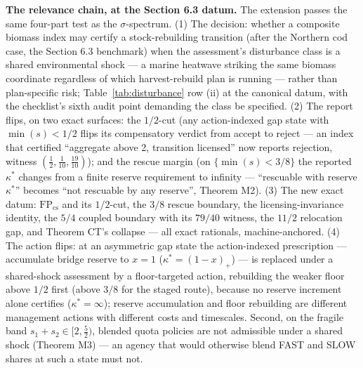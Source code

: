 \documentclass[3p,11pt]{elsarticle}
\begin{document}
\textbf{The relevance chain, at the Section 6.3 datum.} The extension
passes the same four-part test as the \(\sigma\)-spectrum. (1) The
decision: whether a composite biomass index may certify a
stock-rebuilding transition (after the Northern cod case, the Section 6.3
benchmark) when the assessment's disturbance class is a shared
environmental shock --- a marine heatwave striking the same biomass
coordinate regardless of which harvest-rebuild plan is running ---
rather than plan-specific risk; Table~\ref{tab:disturbance} row (ii) at
the canonical datum, with the checklist's sixth audit point demanding
the class be specified. (2) The report flips, on two exact surfaces: the
\(1/2\)-cut (any action-indexed gap state with \(\min(s) < 1/2\)
flips its compensatory verdict from accept to reject --- an index that
certified ``aggregate above 2, transition licensed'' now reports
rejection, witness \((\tfrac12, \tfrac1{10}, \tfrac{19}{10})\)); and
the rescue margin (on \(\{\min(s) < 3/8\}\) the reported
\(\kappa^*\) changes from a finite reserve requirement to infinity
--- ``rescuable with reserve \(\kappa^*\)'' becomes ``not rescuable
by any reserve'', Theorem M2). (3) The new exact datum:
\(\mathrm{FP}_{\mathrm{cs}}\) and its \(1/2\)-cut, the \(3/8\)
rescue boundary, the licensing-invariance identity, the \(5/4\)
coupled boundary with its \(79/40\) witness, the \(11/2\)
relocation gap, and Theorem CT's collapse --- all exact rationals,
machine-anchored. (4) The action flips: at an asymmetric gap state the
action-indexed prescription --- accumulate bridge reserve to \(x =
1\) (\(\kappa^* = (1 - x)_+\)) --- is replaced under a shared-shock
assessment by a floor-targeted action, rebuilding the weaker floor above
\(1/2\) first (above \(3/8\) for the staged route), because no
reserve increment alone certifies (\(\kappa^* = \infty\)); reserve
accumulation and floor rebuilding are different management actions with
different costs and timescales. Second, on the fragile band \(s_1 +
s_2 \in [2, \tfrac52)\), blended quota policies are not admissible
under a shared shock (Theorem M3) --- an agency that would otherwise
blend FAST and SLOW shares at such a state must not.
\end{document}
